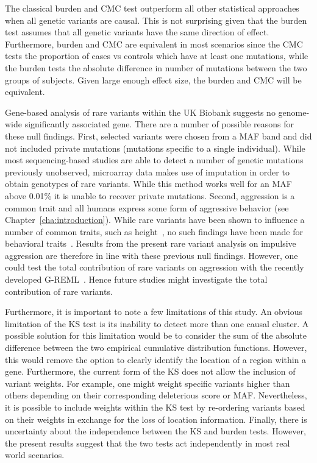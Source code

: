 The classical burden and CMC test outperform all other statistical approaches when all genetic variants are causal.
This is not surprising given that the burden test assumes that all genetic variants have the same direction of effect.
Furthermore, burden and CMC are equivalent in most scenarios since the CMC tests the proportion of cases vs controls which have at least one mutations, while the burden tests the absolute difference in number of  mutations between the two groups of subjects.
Given large enough effect size, the burden and CMC will be equivalent.

Gene-based analysis of rare variants within the UK Biobank suggests no genome-wide significantly associated gene.
There are a number of possible reasons for these null findings.
First, selected variants were chosen from a MAF band and did not included private mutations (mutations specific to a single individual).
While most sequencing-based studies are able to detect a number of genetic mutations previously unobserved, microarray data makes use of imputation in order to obtain genotypes of rare variants.
While this method works well for an MAF above 0.01\% it is unable to recover private mutations.
Second, aggression is a common trait and all humans express some form of aggressive behavior (see Chapter~\ref{cha:introduction}).
While rare variants have been shown to  influence a number of common traits, such as height~\cite{Marouli2017}, no such findings have been made for behavioral traits~\cite{Chabris2015}.
Results from the present rare variant analysis on impulsive aggression are therefore in line with these previous null findings.
However, one could test the total contribution of rare variants on aggression with the recently developed G-REML~\cite{Yang2015a}.
Hence future studies might investigate the total contribution of rare variants.

Furthermore, it is important to note a few limitations of this study.
An obvious limitation of the KS test is its inability to detect more than one causal cluster.
A possible solution for this limitation would be to consider the sum of the absolute difference between the two empirical cumulative distribution functions. 
However, this would remove the option to clearly identify the location of a region within a gene. 
Furthermore, the current form of the KS does not allow the inclusion of variant weights.
For example, one might  weight specific variants higher than others depending  on their corresponding deleterious score or MAF\@.
Nevertheless, it is possible to include weights within the KS test by re-ordering variants based on their weights in exchange for the loss of location information.
Finally, there is  uncertainty about the independence between the KS and burden tests.
However, the  present results suggest that the two tests act independently in most real world scenarios.  


